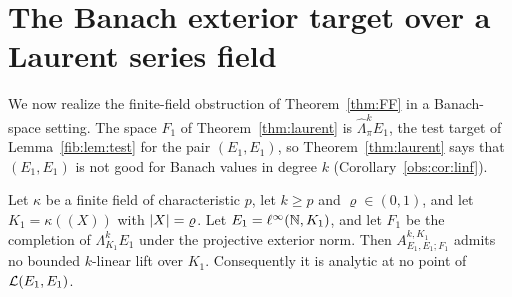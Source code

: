 \section{The Banach exterior target over a Laurent series field}\label{app:laurent}\label{sec:laurent}

We now realize the finite-field obstruction of Theorem~\ref{thm:FF} in a Banach-space setting.
The space $F_1$ of Theorem~\ref{thm:laurent} is $\widehat\Lambda^k_\pi E_1$, the test target of
Lemma~\ref{fib:lem:test} for the pair $(E_1,E_1)$, so Theorem~\ref{thm:laurent} says that $(E_1,E_1)$ is not good for
Banach values in degree $k$ (Corollary~\ref{obs:cor:linf}).

\begin{theorem}\label{thm:laurent}
Let $\kappa$ be a finite field of characteristic $p$, let $k\ge p$ and $\varrho\in(0,1)$, and let $K_1=\kappa((X))$ with
$\lvert X\rvert=\varrho$. Let $E_1=\ell^\infty(\mathbb N,K_1)$, and let $F_1$ be the completion of $\Lambda^k_{K_1}E_1$ under the projective exterior
norm. Then $A^{k,K_1}_{E_1,E_1;F_1}$ admits no bounded $k$\nobreakdash-linear lift over $K_1$. Consequently it is analytic at no point of
$\mathcal L(E_1,E_1)$.
\end{theorem}

